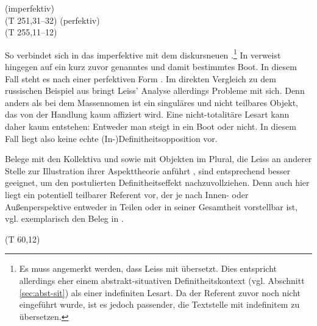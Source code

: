 \begin{exe}
	\ex \label{ex:gi-stigan}   
	\begin{xlist}
		\ex \label{ex:stigan}   (imperfektiv) \\ 
		 (T 251,31--32)
		\ex \label{ex:gistigan}   (perfektiv) \\   (T 255,11--12)
		\end{xlist}
\end{exe}
\noindent
So verbindet sich in  das imperfektive   mit dem diskursneuen .\footnote{Es muss angemerkt werden, dass Leiss  mit  übersetzt. Dies entspricht allerdings eher einem abstrakt-situativen Definitheitskontext (vgl. Abschnitt \ref{sec:abst-sit}) als einer indefiniten Lesart. Da der Referent zuvor noch nicht eingeführt wurde, ist es jedoch passender, die Textstelle mit indefinitem  zu übersetzen.} In  verweist  hingegen auf ein kurz zuvor genanntes und damit bestimmtes Boot. In diesem Fall steht es nach einer perfektiven Form .
Im direkten Vergleich zu dem russischen Beispiel aus  bringt Leiss' Analyse allerdings Probleme mit sich. Denn anders als bei dem Massennomen  ist  ein singuläres und nicht teilbares Objekt, das von der Handlung  kaum affiziert wird. Eine nicht-totalitäre Lesart kann daher kaum entstehen: Entweder man steigt in ein Boot oder nicht. In diesem Fall liegt also keine echte (In-)Definitheitsopposition vor. 

Belege mit den Kollektiva   und   sowie mit Objekten im Plural, die Leiss an anderer Stelle zur Illustration ihrer Aspekttheorie anführt \parencite[170ff.]{Leiss2000}, sind entsprechend besser geeignet, um den postulierten Definitheitseffekt nachzuvollziehen. Denn auch hier liegt ein potentiell teilbarer Referent vor, der je nach Innen- oder Außenperspektive entweder in Teilen oder in seiner Gesamtheit vorstellbar ist, vgl. exemplarisch den Beleg in  \parencite[170]{Leiss2000}. 


\begin{exe}
	\ex \label{ex:menigi}   (T 60,12)\\ 	
\end{exe}

